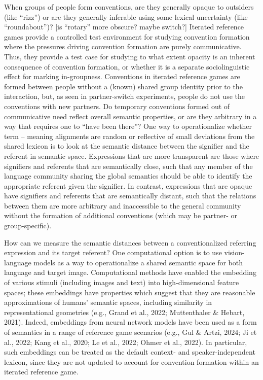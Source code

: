 \documentclass[10pt, letterpaper]{article}
\begin{document}
When groups of people form conventions, are they generally opaque to
outsiders (like ``rizz'') or are they generally inferable using some
lexical uncertainty (like ``roundabout'')? {[}is ``rotary'' more
obscure? maybe switch?{]} Iterated reference games provide a controlled
test environment for studying convention formation where the pressures
driving convention formation are purely communicative. Thus, they
provide a test case for studying to what extent opacity is an inherent
consequence of convention formation, or whether it is a separate
sociolinguistic effect for marking in-groupness. Conventions in iterated
reference games are formed between people without a (known) shared group
identity prior to the interaction, but, as seen in partner-switch
experiments, people do not use the conventions with new partners. Do
temporary conventions formed out of communicative need reflect overall
semantic properties, or are they arbitrary in a way that requires one to
``have been there''? One way to operationalize whether term -- meaning
alignments are random or reflective of small deviations from the shared
lexicon is to look at the semantic distance between the signifier and
the referent in semantic space. Expressions that are more transparent
are those where signifiers and referents that are semantically close,
such that any member of the language community sharing the global
semantics should be able to identify the appropriate referent given the
signifier. In contrast, expressions that are opaque have signifiers and
referents that are semantically distant, such that the relations between
them are more arbitrary and inaccessible to the general community
without the formation of additional conventions (which may be partner-
or group-specific).

How can we measure the semantic distances between a conventionalized
referring expression and its target referent? One computational option
is to use vision-language models as a way to operationalize a shared
semantic space for both language and target image. Computational methods
have enabled the embedding of various stimuli (including images and
text) into high-dimensional feature spaces; these embeddings have
properties which suggest that they are reasonable approximations of
humans' semantic spaces, including similarity in representational
geometries (e.g., Grand et al., 2022; Muttenthaler \& Hebart, 2021).
Indeed, embeddings from neural network models have been used as a form
of semantics in a range of reference game scenarios (e.g., Gul \& Artzi,
2024; Ji et al., 2022; Kang et al., 2020; Le et al., 2022; Ohmer et al.,
2022). In particular, such embeddings can be treated as the default
context- and speaker-independent lexicon, since they are not updated to
account for convention formation within an iterated reference game.
\end{document}
